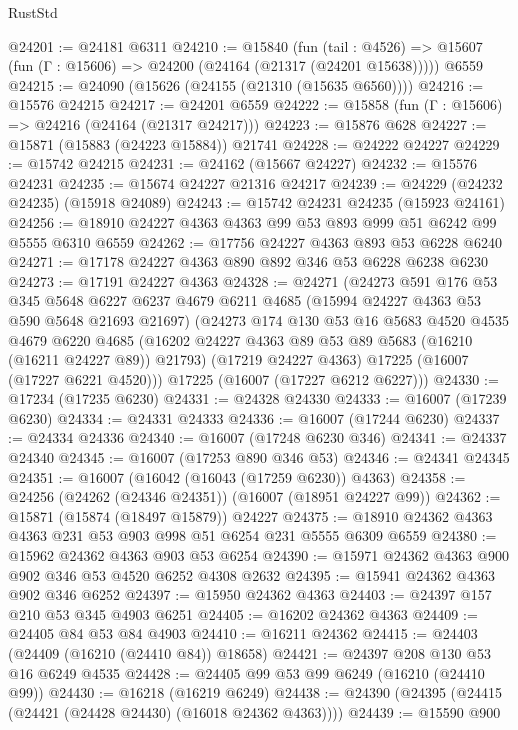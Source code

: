 \begin{lexlean}{RustStd}
\begin{coremodule}
@24201 := @24181 @6311
@24210 := @15840
    (fun (tail : @4526) => @15607 (fun (Γ : @15606) => @24200 (@24164 (@21317 (@24201 @15638)))))
    @6559
@24215 := @24090 (@15626 (@24155 (@21310 (@15635 @6560))))
@24216 := @15576 @24215
@24217 := @24201 @6559
@24222 := @15858 (fun (Γ : @15606) => @24216 (@24164 (@21317 @24217)))
@24223 := @15876 @628
@24227 := @15871 (@15883 (@24223 @15884)) @21741
@24228 := @24222 @24227
@24229 := @15742 @24215
@24231 := @24162 (@15667 @24227)
@24232 := @15576 @24231
@24235 := @15674 @24227 @21316 @24217
@24239 := @24229 (@24232 @24235) (@15918 @24089)
@24243 := @15742 @24231 @24235 (@15923 @24161)
@24256 := @18910 @24227 @4363 @4363 @99 @53 @893 @999 @51 @6242 @99 @5555 @6310 @6559
@24262 := @17756 @24227 @4363 @893 @53 @6228 @6240
@24271 := @17178 @24227 @4363 @890 @892 @346 @53 @6228 @6238 @6230
@24273 := @17191 @24227 @4363
@24328 := @24271
    (@24273
      @591
      @176
      @53
      @345
      @5648
      @6227
      @6237
      @4679
      @6211
      @4685
      (@15994 @24227 @4363 @53 @590 @5648 @21693 @21697)
      (@24273
        @174
        @130
        @53
        @16
        @5683
        @4520
        @4535
        @4679
        @6220
        @4685
        (@16202 @24227 @4363 @89 @53 @89 @5683 (@16210 (@16211 @24227 @89)) @21793)
        (@17219 @24227 @4363)
        @17225
        (@16007 (@17227 @6221 @4520)))
      @17225
      (@16007 (@17227 @6212 @6227)))
@24330 := @17234 (@17235 @6230)
@24331 := @24328 @24330
@24333 := @16007 (@17239 @6230)
@24334 := @24331 @24333
@24336 := @16007 (@17244 @6230)
@24337 := @24334 @24336
@24340 := @16007 (@17248 @6230 @346)
@24341 := @24337 @24340
@24345 := @16007 (@17253 @890 @346 @53)
@24346 := @24341 @24345
@24351 := @16007 (@16042 (@16043 (@17259 @6230)) @4363)
@24358 := @24256 (@24262 (@24346 @24351)) (@16007 (@18951 @24227 @99))
@24362 := @15871 (@15874 (@18497 @15879)) @24227
@24375 := @18910 @24362 @4363 @4363 @231 @53 @903 @998 @51 @6254 @231 @5555 @6309 @6559
@24380 := @15962 @24362 @4363 @903 @53 @6254
@24390 := @15971 @24362 @4363 @900 @902 @346 @53 @4520 @6252 @4308 @2632
@24395 := @15941 @24362 @4363 @902 @346 @6252
@24397 := @15950 @24362 @4363
@24403 := @24397 @157 @210 @53 @345 @4903 @6251
@24405 := @16202 @24362 @4363
@24409 := @24405 @84 @53 @84 @4903
@24410 := @16211 @24362
@24415 := @24403 (@24409 (@16210 (@24410 @84)) @18658)
@24421 := @24397 @208 @130 @53 @16 @6249 @4535
@24428 := @24405 @99 @53 @99 @6249 (@16210 (@24410 @99))
@24430 := @16218 (@16219 @6249)
@24438 := @24390 (@24395 (@24415 (@24421 (@24428 @24430) (@16018 @24362 @4363))))
@24439 := @15590 @900

\end{coremodule}
\end{lexlean}
